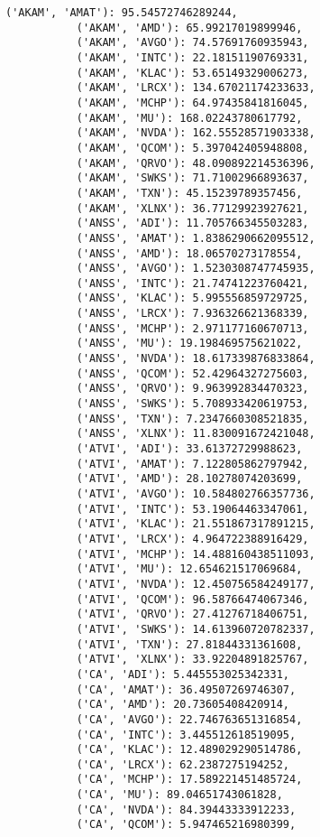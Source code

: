 \documentclass[11pt]{article}
\begin{document}
\begin{Verbatim}[commandchars=\\\{\}]
           ('AKAM', 'AMAT'): 95.54572746289244,
           ('AKAM', 'AMD'): 65.99217019899946,
           ('AKAM', 'AVGO'): 74.57691760935943,
           ('AKAM', 'INTC'): 22.18151190769331,
           ('AKAM', 'KLAC'): 53.65149329006273,
           ('AKAM', 'LRCX'): 134.67021174233633,
           ('AKAM', 'MCHP'): 64.97435841816045,
           ('AKAM', 'MU'): 168.02243780617792,
           ('AKAM', 'NVDA'): 162.55528571903338,
           ('AKAM', 'QCOM'): 5.397042405948808,
           ('AKAM', 'QRVO'): 48.090892214536396,
           ('AKAM', 'SWKS'): 71.71002966893637,
           ('AKAM', 'TXN'): 45.15239789357456,
           ('AKAM', 'XLNX'): 36.77129923927621,
           ('ANSS', 'ADI'): 11.705766345503283,
           ('ANSS', 'AMAT'): 1.8386290662095512,
           ('ANSS', 'AMD'): 18.06570273178554,
           ('ANSS', 'AVGO'): 1.5230308747745935,
           ('ANSS', 'INTC'): 21.74741223760421,
           ('ANSS', 'KLAC'): 5.995556859729725,
           ('ANSS', 'LRCX'): 7.936326621368339,
           ('ANSS', 'MCHP'): 2.971177160670713,
           ('ANSS', 'MU'): 19.198469575621022,
           ('ANSS', 'NVDA'): 18.617339876833864,
           ('ANSS', 'QCOM'): 52.42964327275603,
           ('ANSS', 'QRVO'): 9.963992834470323,
           ('ANSS', 'SWKS'): 5.708933420619753,
           ('ANSS', 'TXN'): 7.2347660308521835,
           ('ANSS', 'XLNX'): 11.830091672421048,
           ('ATVI', 'ADI'): 33.61372729988623,
           ('ATVI', 'AMAT'): 7.122805862797942,
           ('ATVI', 'AMD'): 28.10278074203699,
           ('ATVI', 'AVGO'): 10.584802766357736,
           ('ATVI', 'INTC'): 53.19064463347061,
           ('ATVI', 'KLAC'): 21.551867317891215,
           ('ATVI', 'LRCX'): 4.964722388916429,
           ('ATVI', 'MCHP'): 14.488160438511093,
           ('ATVI', 'MU'): 12.654621517069684,
           ('ATVI', 'NVDA'): 12.450756584249177,
           ('ATVI', 'QCOM'): 96.58766474067346,
           ('ATVI', 'QRVO'): 27.41276718406751,
           ('ATVI', 'SWKS'): 14.613960720782337,
           ('ATVI', 'TXN'): 27.81844331361608,
           ('ATVI', 'XLNX'): 33.92204891825767,
           ('CA', 'ADI'): 5.445553025342331,
           ('CA', 'AMAT'): 36.49507269746307,
           ('CA', 'AMD'): 20.73605408420914,
           ('CA', 'AVGO'): 22.746763651316854,
           ('CA', 'INTC'): 3.445512618519095,
           ('CA', 'KLAC'): 12.489029290514786,
           ('CA', 'LRCX'): 62.2387275194252,
           ('CA', 'MCHP'): 17.589221451485724,
           ('CA', 'MU'): 89.04651743061828,
           ('CA', 'NVDA'): 84.39443333912233,
           ('CA', 'QCOM'): 5.947465216980399,

\end{Verbatim}
\end{document}
